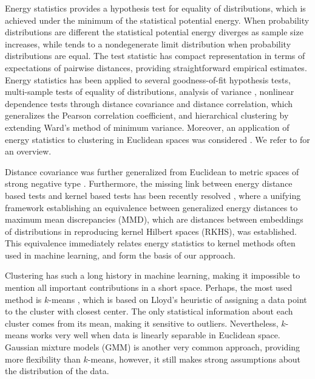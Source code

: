 \documentclass[twoside]{article}
\begin{document}
Energy statistics \citep{Szkely2013}
provides a hypothesis test for equality of 
distributions, which is achieved 
under the minimum of the statistical potential energy. 
When probability distributions are different the 
statistical potential energy diverges as sample size increases, while tends 
to a nondegenerate limit distribution when probability
distributions are equal. 
The test statistic has compact representation
in terms of expectations of pairwise distances, providing
straightforward empirical estimates. Energy statistics
has been applied to several goodness-of-fit 
hypothesis tests, multi-sample tests of equality of distributions, 
analysis of variance \citep{RizzoVariance}, nonlinear dependence tests through
distance covariance and distance correlation, which generalizes the Pearson
correlation coefficient, and hierarchical clustering \citep{RizzoClustering} 
by extending Ward's method of minimum variance. Moreover, an application of 
energy statistics to clustering in Euclidean spaces was 
considered \citep{Kgroups}.  
We refer to \citep{Szkely2013} for an overview.

Distance covariance was further generalized from Euclidean 
to metric spaces of strong negative type \citep{Lyons}. Furthermore, 
the missing link between energy distance based tests and kernel 
based tests has 
been recently resolved \citep{Sejdinovic2013}, where a unifying framework
establishing an equivalence between generalized energy distances to maximum
mean discrepancies (MMD), which are distances between embeddings of 
distributions in reproducing kernel Hilbert spaces (RKHS), was established. 
This equivalence immediately relates energy statistics to
kernel methods often used in machine learning, and form the basis 
of our approach.

Clustering has such a long history in machine learning, making it
impossible to mention all important contributions in a short space. 
Perhaps, the most used method is $k$-means \citep{Lloyd,MacQueen,Forgy}, which
is based on Lloyd's heuristic \citep{Lloyd} of assigning a data point to
the cluster with closest center. The only statistical 
information about each cluster comes from its mean, making it sensitive 
to outliers. Nevertheless, $k$-means works very well when data is 
linearly separable in Euclidean space. Gaussian mixture models (GMM) is 
another very common approach, providing more flexibility than $k$-means, 
however, it still makes strong assumptions about the distribution of 
the data.
\end{document}
